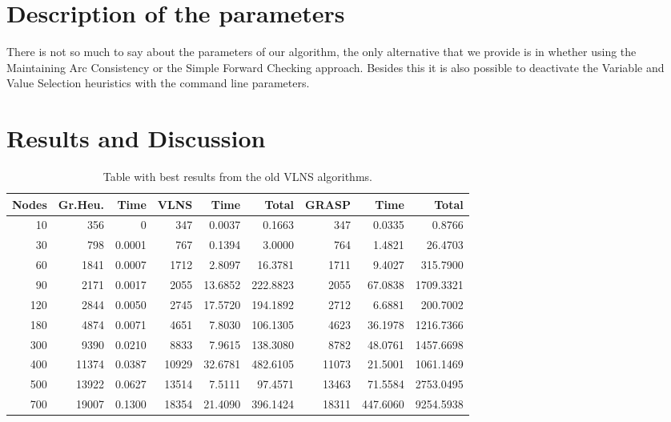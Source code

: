 \documentclass[a4paper]{scrartcl}
\begin{document}
\section{Description of the parameters}

There is not so much to say about the parameters of our algorithm, the only alternative that we provide is in whether using the Maintaining Arc Consistency or the Simple Forward Checking approach. Besides this it is also possible to deactivate the Variable and Value Selection heuristics with the command line parameters.

\section{Results and Discussion}


\begin{table}
  \small
    \begin{adjustwidth}{-.5in}{-.5in}  
        \begin{center}
\begin{tabular}{r | r | r | r | r | r | r | r | r}
\hline
Nodes & Gr.Heu. & Time &  VLNS & Time & Total & GRASP & Time & Total \\
\hline \hline 
10 & 356 & 0 & 347 & 0.0037 & 0.1663 & 347 & 0.0335 & 0.8766 \\
\hline
30 & 798 & 0.0001 & 767 & 0.1394 & 3.0000 & 764 & 1.4821 & 26.4703 \\
\hline
60 & 1841 & 0.0007 & 1712 & 2.8097 & 16.3781 & 1711 & 9.4027 & 315.7900 \\
\hline
90 & 2171 & 0.0017 & 2055 & 13.6852 & 222.8823 & 2055 & 67.0838 & 1709.3321\\
\hline
120 & 2844 & 0.0050 & 2745 & 17.5720 & 194.1892 & 2712 & 6.6881 & 200.7002 \\
\hline
180 & 4874 & 0.0071 & 4651 & 7.8030 & 106.1305 & 4623 & 36.1978 & 1216.7366 \\
\hline
300 & 9390 & 0.0210 & 8833 & 7.9615 & 138.3080 & 8782 & 48.0761 & 1457.6698 \\
\hline
400 & 11374 & 0.0387 & 10929 & 32.6781 & 482.6105 & 11073 & 21.5001 & 1061.1469 \\
\hline
500 & 13922 & 0.0627 & 13514 & 7.5111 & 97.4571 & 13463 & 71.5584 & 2753.0495 \\
\hline
700 & 19007 & 0.1300 & 18354 & 21.4090 & 396.1424 & 18311 & 447.6060 & 9254.5938 \\
\hline
\end{tabular}
        \caption{Table with best results from the old VLNS algorithms. }
        \label{myTable1}
        \end{center}
    \end{adjustwidth}
\end{table}





\end{document}
